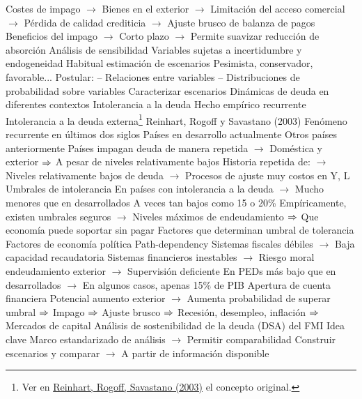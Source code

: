 \documentclass{nuevotema}
\begin{document}
\begin{esquemal}
				\4[] Costes de impago
				\4[] $\to$ Bienes en el exterior
				\4[] $\to$ Limitación del acceso comercial
				\4[] $\to$ Pérdida de calidad crediticia
				\4[] $\to$ Ajuste brusco de balanza de pagos
				\4[] Beneficios del impago
				\4[] $\to$ Corto plazo
				\4[] $\to$ Permite suavizar reducción de absorción
			\3 Análisis de sensibilidad
				\4 Variables sujetas a incertidumbre y endogeneidad
				\4 Habitual estimación de escenarios
				\4[] Pesimista, conservador, favorable...
				\4 Postular:
				\4[] -- Relaciones entre variables
				\4[] -- Distribuciones de probabilidad sobre variables
				\4 Caracterizar escenarios
				\4[] Dinámicas de deuda en diferentes contextos
			\3 Intolerancia a la deuda
				\4 Hecho empírico recurrente
			\3 Intolerancia a la deuda externa\footnote{Ver en \href{https://www.nber.org/papers/w9908}{Reinhart, Rogoff, Savastano (2003)} el concepto original.}
				\4 Reinhart, Rogoff y Savastano (2003)
				\4 Fenómeno recurrente en últimos dos siglos
				\4[] Países en desarrollo actualmente
				\4[] Otros países anteriormente
				\4[] Países impagan deuda de manera repetida
				\4[] $\to$ Doméstica y exterior
				\4[] $\Rightarrow$ A pesar de niveles relativamente bajos
				\4[] Historia repetida de:
				\4[] $\to$ Niveles relativamente bajos de deuda
				\4[] $\to$ Procesos de ajuste muy costos en Y, L
				\4 Umbrales de intolerancia
				\4[] En países con intolerancia a la deuda
				\4[] $\to$ Mucho menores que en desarrollados
				\4[] A veces tan bajos como 15 o 20\%
				\4[] Empíricamente, existen umbrales seguros
				\4[] $\to$ Niveles máximos de endeudamiento
				\4[] $\Rightarrow$ Que economía puede soportar sin pagar
				\4 Factores que determinan umbral de tolerancia
				\4[] Factores de economía política
				\4[] Path-dependency
				\4[] Sistemas fiscales débiles
				\4[] $\to$ Baja capacidad recaudatoria
				\4[] Sistemas financieros inestables
				\4[] $\to$ Riesgo moral endeudamiento exterior
				\4[] $\to$ Supervisión deficiente
				\4 En PEDs más bajo que en desarrollados
				\4[] $\to$ En algunos casos, apenas 15\% de PIB
				\4 Apertura de cuenta financiera
				\4[] Potencial aumento exterior
				\4[] $\to$ Aumenta probabilidad de superar umbral
				\4[] $\Rightarrow$ Impago
				\4[] $\Rightarrow$ Ajuste brusco
				\4[] $\Rightarrow$ Recesión, desempleo, inflación
				\4[] $\Rightarrow$ Mercados de capital
			\3 Análisis de sostenibilidad de la deuda (DSA) del FMI
				\4 Idea clave
				\4[] Marco estandarizado de análisis
				\4[] $\to$ Permitir comparabilidad
				\4[] Construir escenarios y comparar
				\4[] $\to$ A partir de información disponible

\end{esquemal}
\end{document}
